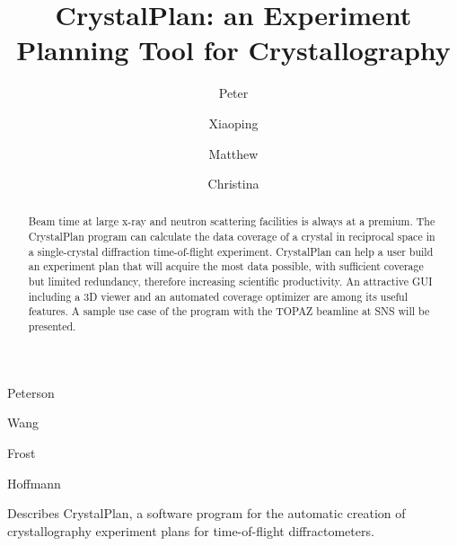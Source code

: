 \documentclass[draft]{iucr}              %
\begin{document}


\title{CrystalPlan: an Experiment Planning Tool for Crystallography}



\author[a]{Peter}{Peterson}
\author[a]{Xiaoping}{Wang}
\author[a]{Matthew}{Frost}
\author[a]{Christina}{Hoffmann}







\maketitle                        %

\begin{synopsis}
Describes CrystalPlan, a software program for the automatic creation of 
crystallography experiment plans for time-of-flight diffractometers.
\end{synopsis}

\begin{abstract}
Beam time at large x-ray and neutron scattering facilities is always at a premium.
The CrystalPlan program can calculate the data coverage of a crystal in reciprocal
space in a single-crystal diffraction time-of-flight experiment. CrystalPlan can 
help a user build an experiment plan that will acquire the most data possible, 
with sufficient coverage but limited redundancy, therefore increasing scientific 
productivity. 
An attractive GUI including a 3D viewer and an automated coverage optimizer 
are among its useful features. 
A sample use case of the program with the TOPAZ beamline at SNS will be
presented. 
\end{abstract}
\end{document}
